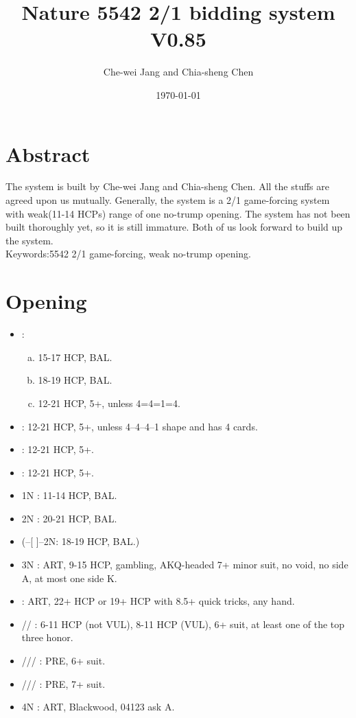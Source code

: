 \documentclass[12pt,twoside,a5paper]{report}%
\begin{document}
\title{Nature 5542 2/1 bidding system V0.85}
\author{Che-wei Jang and Chia-sheng Chen}
\date{\today}
\maketitle
\tableofcontents


\chapter*{Abstract}
	The system is built by Che-wei Jang and Chia-sheng Chen. All the stuffs are agreed upon us mutually. Generally, the system is a 2/1 game-forcing system with weak(11-14 HCPs) range of one no-trump opening.
	The system has not been built thoroughly yet, so it is still immature. Both of us look forward to build up the system.\\
	Keywords:5542 2/1 game-forcing, weak no-trump opening.
\chapter*{Opening}
	\begin{itemize}
	\renewcommand{\labelitemi}{}
		\item {}: 
		\begin{enumerate}[(a)]
			\item 15-17 HCP, BAL.
			\item 18-19 HCP, BAL.
			\item 12-21 HCP, 5+\cl{}, unless 4=4=1=4.
		\end{enumerate}
		\item {} : 12-21 HCP, 5+\di{}, unless 4--4--4--1 shape and \di{} has 4 cards.
		\item {} : 12-21 HCP, 5+\he{}.
		\item {} : 12-21 HCP, 5+\sp{}.
		\item 1N : 11-14 HCP, BAL.
		\item 2N : 20-21 HCP, BAL.
		\item (--[ ]--2N: 18-19 HCP, BAL.)
		\item 3N : ART, 9-15 HCP, gambling, AKQ-headed 7+ minor suit, no void, no side A, at most one side K.
		\item {} : ART, 22+ HCP or 19+ HCP with 8.5+ quick tricks, any hand.
		\item {}/\he{}/\sp{} : 6-11 HCP (not VUL), 8-11 HCP (VUL), 6+ suit, at least one of the top three honor.
		\item {}/\di{}/\he{}/\sp{} : PRE, 6+ suit.
		\item {}/\di{}/\he{}/\sp{} : PRE, 7+ suit.
		\item 4N : ART, Blackwood, 04123 ask A.
	\end{itemize}
\end{document}
